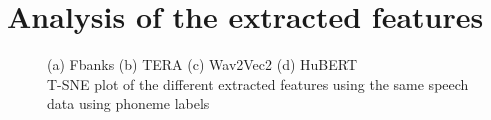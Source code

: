 \section{Analysis of the extracted features}
\begin{figure}
  \begin{center}
  \centering
  \caption{(a) Fbanks (b) TERA (c) Wav2Vec2 (d) HuBERT \\ T-SNE plot of the different extracted features using the same speech data using phoneme labels}
  \label{fig:tsne_SSL}  
\end{center}
\end{figure}
